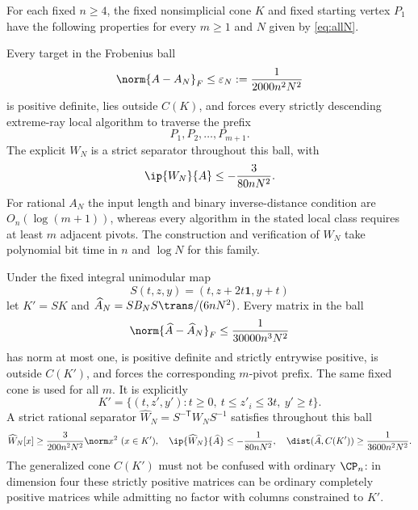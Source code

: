 \begin{theorem}\label{thm:alllocal}
For each fixed $n\ge4$, the fixed nonsimplicial cone $K$ and fixed starting vertex $P_1$ have the following properties for every $m\ge1$ and $N$ given by \eqref{eq:allN}.

Every target in the Frobenius ball
\begin{equation}\label{eq:allball}
 \norm{A-A_N}_F\le\varepsilon_N:=\frac1{2000n^2N^2}
\end{equation}
is positive definite, lies outside $C(K)$, and forces every strictly descending extreme-ray local algorithm to traverse the prefix
\[
 P_1,P_2,\ldots,P_{m+1}.
\]
The explicit $W_N$ is a strict separator throughout this ball, with
\[
 \ip{W_N}{A}\le-\frac3{80nN^2}.
\]
For rational $A_N$ the input length and binary inverse-distance condition are $O_n(\log(m+1))$, whereas every algorithm in the stated local class requires at least $m$ adjacent pivots. The construction and verification of $W_N$ take polynomial bit time in $n$ and $\log N$ for this family.

Under the fixed integral unimodular map
\begin{equation}\label{eq:allS}
 S(t,z,y)=(t,z+2t\mathbf1,y+t)
\end{equation}
let $K'=SK$ and $\widehat A_N=SB_NS\trans/(6nN^2)$. Every matrix in the ball
\begin{equation}\label{eq:allpositiveball}
 \norm{\widehat A-\widehat A_N}_F\le\frac1{30000n^3N^2}
\end{equation}
has norm at most one, is positive definite and strictly entrywise positive, is outside $C(K')$, and forces the corresponding $m$-pivot prefix. The same fixed cone is used for all $m$. It is explicitly
\[
 K'=\{(t,z',y'):t\ge0,\ t\le z'_i\le3t,\ y'\ge t\}.
\]
A strict rational separator $\widehat W_N=S^{-\mathsf T}W_NS^{-1}$ satisfies throughout this ball
\begin{equation}\label{eq:allfinalmargins}
 \widehat W_N[x]\ge\frac3{200n^2N^2}\norm x^2\ (x\in K'),\quad
 \ip{\widehat W_N}{\widehat A}\le-\frac1{80nN^2},\quad
 \dist(\widehat A,C(K'))\ge\frac1{3600n^2N^2}.
\end{equation}
The generalized cone $C(K')$ must not be confused with ordinary $\CP_n$: in dimension four these strictly positive matrices can be ordinary completely positive matrices while admitting no factor with columns constrained to $K'$.
\end{theorem}
